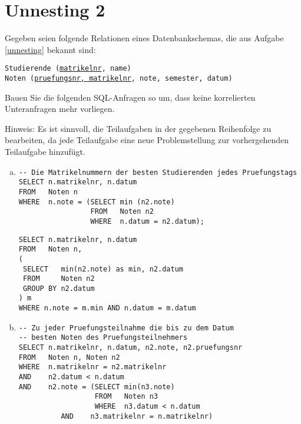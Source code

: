 \section{Unnesting 2}
\label{unnesting2}

Gegeben seien folgende Relationen eines Datenbankschemas, die aus Aufgabe \ref{unnesting} bekannt sind:

\texttt{Studierende (\underline{matrikelnr}, name)} \\
\texttt{Noten (\underline{pruefungsnr, matrikelnr}, note, semester, datum)}

Bauen Sie die folgenden SQL-Anfragen so um, dass keine korrelierten Unteranfragen mehr vorliegen.

\cprotEnv
\begin{normalText}
Hinweis: Es ist sinnvoll, die Teilaufgaben in der gegebenen Reihenfolge zu bearbeiten, da jede Teilaufgabe eine neue Problemstellung zur vorhergehenden Teilaufgabe hinzufügt.

\begin{enumerate}[a)]

\item

\begin{lstlisting}
-- Die Matrikelnummern der besten Studierenden jedes Pruefungstags
SELECT n.matrikelnr, n.datum
FROM   Noten n
WHERE  n.note = (SELECT min (n2.note)
                 FROM   Noten n2
                 WHERE  n.datum = n2.datum);
\end{lstlisting} \label{first}

\cprotEnv
\begin{note}
\begin{lstlisting}
SELECT n.matrikelnr, n.datum
FROM   Noten n,
(
 SELECT   min(n2.note) as min, n2.datum
 FROM     Noten n2
 GROUP BY n2.datum
) m
WHERE n.note = m.min AND n.datum = m.datum
\end{lstlisting}
\end{note}

\item

\begin{lstlisting}
-- Zu jeder Pruefungsteilnahme die bis zu dem Datum
-- besten Noten des Pruefungsteilnehmers
SELECT n.matrikelnr, n.datum, n2.note, n2.pruefungsnr
FROM   Noten n, Noten n2
WHERE  n.matrikelnr = n2.matrikelnr
AND    n2.datum < n.datum
AND    n2.note = (SELECT min(n3.note)
                  FROM   Noten n3
                  WHERE  n3.datum < n.datum
		  AND    n3.matrikelnr = n.matrikelnr)
\end{lstlisting}


\end{enumerate}
\end{normalText}
